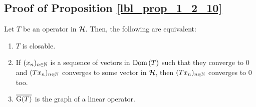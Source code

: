 \subsection{Proof of Proposition \eqref{lbl_prop_1_2_10}}\label{proof_lbl_prop_1_2_10}

\begin{proposition}
  Let $T$ be an operator in $\mathcal{H}$. Then, the following are equivalent:
  \begin{enumerate}[label = (\alph*)]
    \item $T$ is closable.
    \item If $(x_n)_{n \in \mathbb{N}}$ is a sequence of vectors in $\operatorname{Dom}\left(T\right)$ such that they converge to 0 and $(Tx_n)_{n \in \mathbb{N}}$ converges to some vector in $\mathcal{H}$, then $(Tx_n)_{n \in  \mathbb{N}}$ converges to 0 too.
    \item $\overline{\operatorname{G}(T)}$ is the graph of a linear operator.
  \end{enumerate}
\end{proposition}
